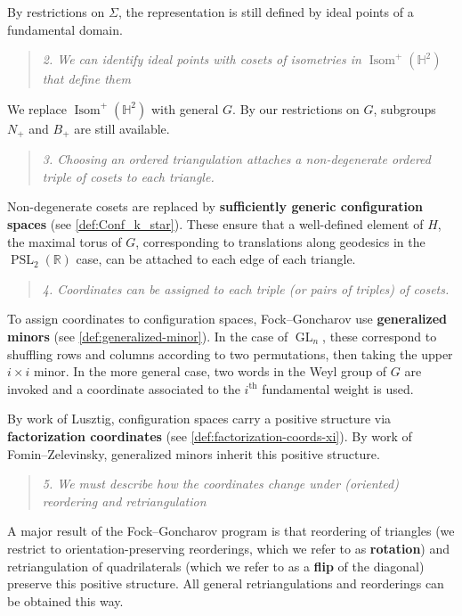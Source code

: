 \documentclass{amsart}
\theoremstyle{plain}
\theoremstyle{definition}
\theoremstyle{remark}
\newcommand{\defined}[1]{\textbf{#1}}
\DeclareMathOperator{\GL}{GL}
\DeclareMathOperator{\Isom}{Isom}
\DeclareMathOperator{\PSL}{PSL}
\begin{document}
  By restrictions on $\Sigma$, the representation is still defined by
  ideal points of a fundamental domain.

  \begin{quote}
    \emph{2. We can identify ideal points with cosets of isometries in
      $\Isom^{+}(\mathbb{H}^2)$ that define them}
  \end{quote}

  We replace $\Isom^{+}(\mathbb{H}^2)$ with general $G$. By our
  restrictions on $G$, subgroups $N_{+}$ and $B_{+}$ are still
  available.

  \begin{quote}
    \emph{3. Choosing an ordered triangulation attaches a non-degenerate
      ordered triple of cosets to each triangle.}
  \end{quote}

  Non-degenerate cosets are replaced by \defined{sufficiently generic
    configuration spaces} (see \cref{def:Conf_k_star}). These ensure
  that a well-defined element of $H$, the maximal torus of $G$,
  corresponding to translations along geodesics in the
  $\PSL_2(\mathbb{R})$ case, can be attached to each edge of each
  triangle.

  \begin{quote}
    \emph{4. Coordinates can be assigned to each triple (or pairs of
      triples) of cosets.}
  \end{quote}

  To assign coordinates to configuration spaces, Fock--Goncharov use
  \defined{generalized minors} (see \cref{def:generalized-minor}). In
  the case of $\GL_n$, these correspond to shuffling rows and columns
  according to two permutations, then taking the upper $i \times i$
  minor. In the more general case, two words in the Weyl group of $G$
  are invoked and a coordinate associated to the $i^{\text{th}}$
  fundamental weight is used.

  By work of Lusztig, configuration spaces carry a positive structure
  via \defined{factorization coordinates} (see
  \cref{def:factorization-coords-xi}). By work of Fomin--Zelevinsky,
  generalized minors inherit this positive structure.

  \begin{quote}
    \emph{5. We must describe how the coordinates change under
      (oriented) reordering and retriangulation}
  \end{quote}

  A major result of the Fock--Goncharov program is that reordering of
  triangles (we restrict to orientation-preserving reorderings, which we
  refer to as \defined{rotation}) and retriangulation of quadrilaterals
  (which we refer to as a \defined{flip} of the diagonal) preserve this
  positive structure. All general retriangulations and reorderings can
  be obtained this way.
\end{document}
